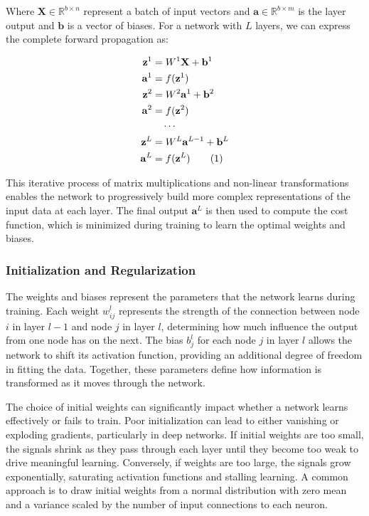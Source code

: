 \documentclass[aps,pra,english,notitlepage,reprint,nofootinbib]{revtex4-1}  %
\newcommand\numberthis{\addtocounter{equation}{1}\tag{\theequation}}
\begin{document}
Where \( \mathbf{X} \in \mathbb{R}^{b \times n}\) represent a batch of input vectors and \( \mathbf{a} \in \mathbb{R}^{b \times m} \) is the layer output and \( \mathbf{b} \) is a vector of biases. For a network with \( L \) layers, we can express the complete forward propagation as:

\begin{align*}
    \mathbf{z}^1 &= W^1\mathbf{X} + \mathbf{b}^1 \\
    \mathbf{a}^1 &= f(\mathbf{z}^1) \\
    \mathbf{z}^2 &= W^2\mathbf{a}^1 + \mathbf{b}^2 \\
    \mathbf{a}^2 &= f(\mathbf{z}^2) \\
    & \quad \cdots \\
    \mathbf{z}^L &= W^L\mathbf{a}^{L-1} + \mathbf{b}^L \\
    \mathbf{a}^L &= f(\mathbf{z}^L) \numberthis \label{eqn}
\end{align*}

This iterative process of matrix multiplications and non-linear transformations enables the network to progressively build more complex representations of the input data at each layer. The final output \( \mathbf{a}^L \) is then used to compute the cost function, which is minimized during training to learn the optimal weights and biases.

\subsubsection{Initialization and Regularization}
The weights and biases represent the parameters that the network learns during training. Each weight \(w_{ij}^l \) represents the strength of the connection between node \( i \) in layer \( l-1 \) and node \( j \) in layer \( l \), determining how much influence the output from one node has on the next. The bias \( b_j^l \) for each node \( j \) in layer \( l \) allows the network to shift its activation function, providing an additional degree of freedom in fitting the data. Together, these parameters define how information is transformed as it moves through the network.

The choice of initial weights can significantly impact whether a network learns effectively or fails to train. Poor initialization can lead to either vanishing or exploding gradients, particularly in deep networks. If initial weights are too small, the signals shrink as they pass through each layer until they become too weak to drive meaningful learning. Conversely, if weights are too large, the signals grow exponentially, saturating activation functions and stalling learning.
A common approach is to draw initial weights from a normal distribution with zero mean and a variance scaled by the number of input connections to each neuron.
\end{document}
